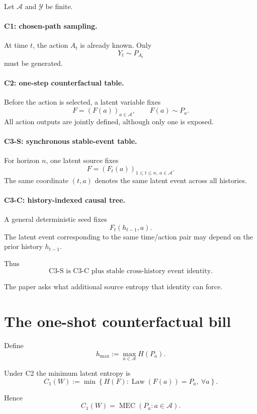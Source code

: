 \documentclass[11pt,a4paper]{article}
\newcommand{\Law}{\operatorname{Law}}
\newcommand{\MEC}{\operatorname{MEC}}
\newcommand{\cA}{\mathcal A}
\newcommand{\cY}{\mathcal Y}
\newcommand{\1}{\mathbf 1}
\begin{document}
Let \(\cA\) and \(\cY\) be finite.

\paragraph{C1: chosen-path sampling.}
At time \(t\), the action \(A_t\) is already known.
Only
\[
Y_t\sim P_{A_t}
\]
must be generated.

\paragraph{C2: one-step counterfactual table.}
Before the action is selected, a latent variable fixes
\[
F=(F(a))_{a\in\cA},
\qquad
F(a)\sim P_a.
\tag{3.1}
\]
All action outputs are jointly defined, although only one is exposed.

\paragraph{C3-S: synchronous stable-event table.}
For horizon \(n\), one latent source fixes
\[
F=(F_t(a))_{1\le t\le n,\ a\in\cA}.
\tag{3.2}
\]
The same coordinate \((t,a)\) denotes the same latent event across all
histories.

\paragraph{C3-C: history-indexed causal tree.}
A general deterministic seed fixes
\[
F_t(h_{t-1},a).
\tag{3.3}
\]
The latent event corresponding to the same time/action pair may depend
on the prior history \(h_{t-1}\).

Thus
\[
\boxed{
\text{C3-S is C3-C plus stable cross-history event identity.}
}
\tag{3.4}
\]

The paper asks what additional source entropy that identity can force.


\section{The one-shot counterfactual bill}

Define
\[
h_{\max}
:=
\max_{a\in\cA} H(P_a).
\tag{4.1}
\]

Under C2 the minimum latent entropy is
\[
C_1(W)
:=
\min
\left\{
H(F):
\Law(F(a))=P_a,\ \forall a
\right\}.
\tag{4.2}
\]

Hence
\[
\boxed{
C_1(W)
=
\MEC(P_a:a\in\cA).
}
\tag{4.3}
\]
\end{document}
